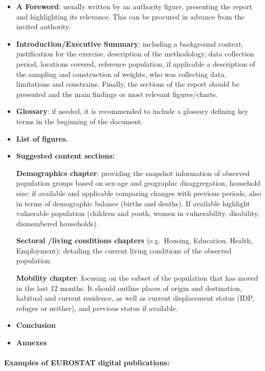 \documentclass[
]{article}
\begin{document}
\begin{itemize}
\item
  \textbf{A Foreword}: usually written by an authority figure, presenting
  the report and highlighting its relevance. This can be procured in
  advance from the invited authority.
\item
  \textbf{Introduction/Executive Summary}: including a background context,
  justification for the exercise, description of the methodology, data
  collection period, locations covered, reference population, if
  applicable a description of the sampling and construction of
  weights, who was collecting data, limitations and constrains.
  Finally, the sections of the report should be presented and the main
  findings or most relevant figures/charts.
\item
  \textbf{Glossary}: if needed, it is recommended to include a glossary
  defining key terms in the beginning of the document.
\item
  \textbf{List of figures.}
\item
  \textbf{Suggested content sections:}

  \textbf{Demographics chapter}: providing the snapshot information of
  observed population groups based on sex-age and geographic
  disaggregation, household size; if available and applicable
  comparing changes with previous periods, also in terms of
  demographic balance (births and deaths). If available highlight
  vulnerable population (children and youth, women in vulnerability,
  disability, dismembered households).

  \textbf{Sectoral /living conditions chapters} (e.g.~Housing, Education,
  Health, Employment): detailing the current living conditions of the
  observed population.

  \textbf{Mobility chapter}: focusing on the subset of the population that
  has moved in the last 12 months. It should outline places of origin
  and destination, habitual and current residence, as well as current
  displacement status (IDP, refugee or neither), and previous status
  if available.
\end{itemize}

\begin{itemize}
\item
  \textbf{Conclusion}
\item
  \textbf{Annexes}
\end{itemize}

\hypertarget{examples-of-eurostat-digital-publications}{%
\paragraph{Examples of EUROSTAT digital publications:}\label{examples-of-eurostat-digital-publications}}
\end{document}
